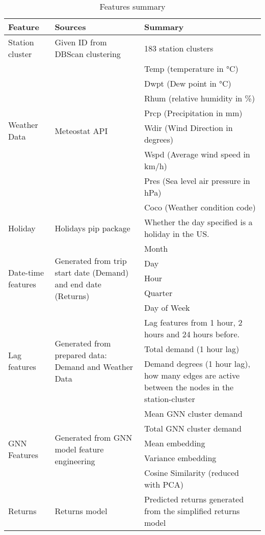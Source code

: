 \documentclass{article}
\begin{document}
\begin{center}
\begin{table}[]
\hspace*{-2cm}  
\begin{tabular}{|m{7em} | m{9em} | m{22em}|}
\hline
\textbf{Feature} & \textbf{Sources} & \textbf{Summary} \\ \hline
Station cluster & Given ID from DBScan clustering & 183 station clusters \\ \hline
\multirow{7}{7em}{Weather Data} & \multirow{7}{9em}{Meteostat API} & Temp (temperature in  °C) 
\\ \cline{3-3} & & Dwpt (Dew point in  °C)
\\ \cline{3-3} & & Rhum (relative humidity in \%)
\\ \cline{3-3} & & Prcp (Precipitation in mm) 
\\ \cline{3-3} & & Wdir (Wind Direction in degrees) 
\\ \cline{3-3} & & Wspd (Average wind speed in km/h)
\\ \cline{3-3} & & Pres (Sea level air pressure in hPa)
\\ \cline{3-3} & & Coco (Weather condition code) \\ \hline
Holiday & Holidays pip package & Whether the day specified is a holiday in the US. \\ \hline
\multirow{5}{7em}{Date-time features} & \multirow{5}{9em}{Generated from trip start date (Demand) and end date (Returns)} & Month 
\\ \cline{3-3} & & Day 
\\ \cline{3-3} & & Hour
\\ \cline{3-3} & & Quarter
\\ \cline{3-3} & & Day of Week 
\\ \hline
\multirow{3}{7em}{Lag features} & \multirow{3}{9em}{Generated from prepared data: Demand and Weather Data} & Lag features from 1 hour, 2 hours and 24 hours before.
\\ \cline{3-3} & & Total demand (1 hour lag)
\\ \cline{3-3} & & Demand degrees (1 hour lag), how many edges are active between the nodes in the station-cluster
\\ \hline
\multirow{5}{7em}{GNN Features} & \multirow{5}{9em}{Generated from GNN model feature engineering} & Mean GNN cluster demand
\\ \cline{3-3} & & Total GNN cluster demand
\\ \cline{3-3} & & Mean embedding 
\\ \cline{3-3} & & Variance embedding
\\ \cline{3-3} & & Cosine Similarity (reduced with PCA)
\\ \hline
Returns  & Returns model & Predicted returns generated from  the simplified returns model
\\ \hline
\end{tabular}
\caption{Features summary}
\label{t:features}
\end{table}
\end{center}
\end{document}
